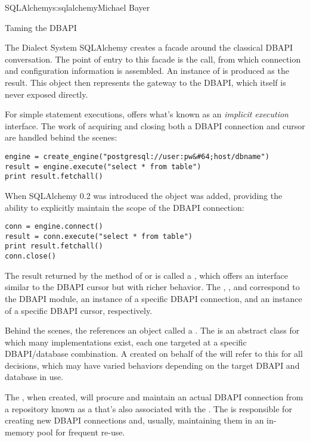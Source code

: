 \begin{aosachapter}{SQLAlchemy}{s:sqlalchemy}{Michael Bayer}
\begin{aosasect1}{Taming the DBAPI}
\begin{aosasect2}{The Dialect System}
SQLAlchemy creates a facade around the classical DBAPI conversation.  The
point of entry to this facade is the  call, from which
connection and configuration information is assembled.  An instance of
 is produced as the result. This object then represents the gateway
to the DBAPI, which itself is never exposed directly.

For simple statement executions,  offers
what's known as an \emph{implicit execution} interface.  The work
of acquiring and closing both a DBAPI connection
and cursor are handled behind the scenes:

\begin{verbatim}
engine = create_engine("postgresql://user:pw&#64;host/dbname")
result = engine.execute("select * from table")
print result.fetchall()
\end{verbatim}

When SQLAlchemy 0.2 was introduced the  object
was added, providing the ability to explicitly maintain the
scope of the DBAPI connection:

\begin{verbatim}
conn = engine.connect()
result = conn.execute("select * from table")
print result.fetchall()
conn.close()
\end{verbatim}

The result returned by the  method of 
or  is called a , which offers
an interface similar to the DBAPI cursor but with richer
behavior.   The ,
, and  correspond to
the DBAPI module, an instance of a specific
DBAPI connection, and an instance of a specific DBAPI
cursor, respectively.

Behind the scenes, the  references an object
called a .  The  is an abstract
class for which many implementations exist, each one targeted
at a specific DBAPI/database combination.  A  created on
behalf of the  will refer to this 
for all decisions, which may have varied behaviors depending on the target DBAPI and database in use.

The , when created,
will procure and maintain an actual DBAPI connection from a repository
known as a  that's also associated with the .
The  is responsible for creating new DBAPI connections and,
usually, maintaining them in an in-memory pool for frequent re-use.


\end{aosasect2}
\end{aosasect1}
\end{aosachapter}
